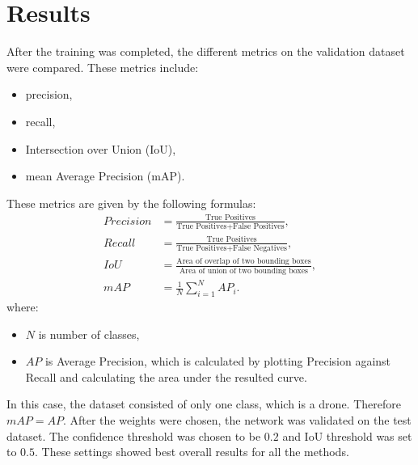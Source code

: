 \documentclass[twoside]{ctuthesis}
\theoremstyle{plain}
\theoremstyle{definition}
\theoremstyle{note}
\begin{document}
\chapter{Results}
After the training was completed, the different metrics on the validation dataset were compared. These metrics include:
\begin{itemize}
	\item precision,
	\item recall,
	\item Intersection over Union (IoU),
	\item mean Average Precision (mAP).
\end{itemize}
These metrics are given by the following formulas:
\begin{equation}
	\begin{aligned}
		Precision &= \frac{\text{True Positives}}{\text{True Positives} + \text{False Positives}},\\
		Recall &= \frac{\text{True Positives}}{\text{True Positives} + \text{False Negatives}},\\
		IoU &= \frac{\text{Area of overlap of two bounding boxes}}{\text{Area of union of two bounding boxes}},\\
		mAP &= \frac{1}{N}\sum^N_{i=1}AP_i.
	\end{aligned}
\end{equation}
where:
\begin{itemize}
	\item $N$ is number of classes,
	\item $AP$ is Average Precision, which is calculated by plotting Precision against Recall and calculating the area under the resulted curve.
\end{itemize}
In this case, the dataset consisted of only one class, which is a drone. Therefore $mAP=AP$. After the weights were chosen, the network was validated on the test dataset. The confidence threshold was chosen to be $0.2$ and IoU threshold was set to $0.5$. These settings showed best overall results for all the methods.
\end{document}
